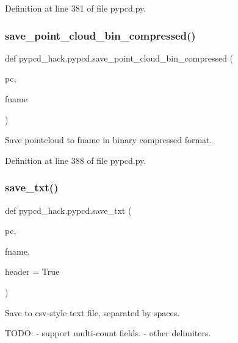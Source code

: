 Definition at line 381 of file pypcd.\+py.

\mbox{\label{namespacepypcd__hack_1_1pypcd_abd2032038eac8692ef731459ebbdca97}} 
\subsubsection{\texorpdfstring{save\+\_\+point\+\_\+cloud\+\_\+bin\+\_\+compressed()}{save\_point\_cloud\_bin\_compressed()}}
{\footnotesize\ttfamily def pypcd\+\_\+hack.\+pypcd.\+save\+\_\+point\+\_\+cloud\+\_\+bin\+\_\+compressed (\begin{DoxyParamCaption}\item[{}]{pc,  }\item[{}]{fname }\end{DoxyParamCaption})}

\begin{DoxyVerb}Save pointcloud to fname in binary compressed format.
\end{DoxyVerb}
 

Definition at line 388 of file pypcd.\+py.

\mbox{\label{namespacepypcd__hack_1_1pypcd_aeac370634949adb389fb6221ce09a663}} 
\subsubsection{\texorpdfstring{save\+\_\+txt()}{save\_txt()}}
{\footnotesize\ttfamily def pypcd\+\_\+hack.\+pypcd.\+save\+\_\+txt (\begin{DoxyParamCaption}\item[{}]{pc,  }\item[{}]{fname,  }\item[{}]{header = {\ttfamily True} }\end{DoxyParamCaption})}

\begin{DoxyVerb}Save to csv-style text file, separated by spaces.

TODO:
- support multi-count fields.
- other delimiters.
\end{DoxyVerb}
 

